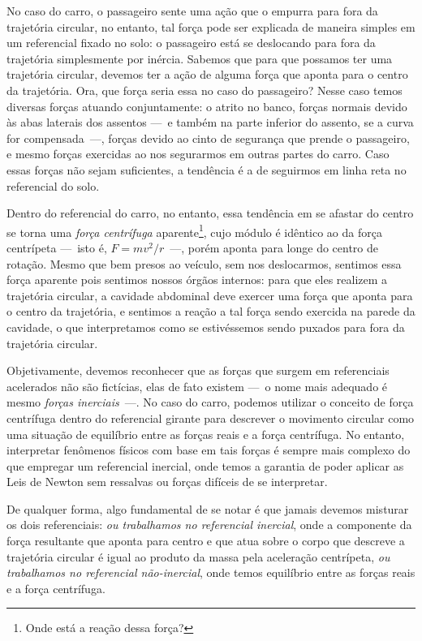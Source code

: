 No caso do carro, o passageiro sente uma ação que o empurra para fora da trajetória circular, no entanto, tal força pode ser explicada de maneira simples em um referencial fixado no solo: o passageiro está se deslocando para fora da trajetória simplesmente por inércia. Sabemos que para que possamos ter uma trajetória circular, devemos ter a ação de alguma força que aponta para o centro da trajetória. Ora, que força seria essa no caso do passageiro? Nesse caso temos diversas forças atuando conjuntamente: o atrito no banco, forças normais devido às abas laterais dos assentos ---~e também na parte inferior do assento, se a curva for compensada~---, forças devido ao cinto de segurança que prende o passageiro, e mesmo forças exercidas ao nos segurarmos em outras partes do carro. Caso essas forças não sejam suficientes, a tendência é a de seguirmos em linha reta no referencial do solo.

Dentro do referencial do carro, no entanto, essa tendência em se afastar do centro se torna uma \emph{força centrífuga} aparente\footnote{Onde está a reação dessa força?}, cujo módulo é idêntico ao da força centrípeta ---~isto é, $F = mv^2/r$~---, porém aponta para longe do centro de rotação. Mesmo que bem presos ao veículo, sem nos deslocarmos, sentimos essa força aparente pois sentimos nossos órgãos internos: para que eles realizem a trajetória circular, a cavidade abdominal deve exercer uma força que aponta para o centro da trajetória, e sentimos a reação a tal força sendo exercida na parede da cavidade, o que interpretamos como se estivéssemos sendo puxados para fora da trajetória circular.

Objetivamente, devemos reconhecer que as forças que surgem em referenciais acelerados não são fictícias, elas de fato existem ---~o nome mais adequado é mesmo \emph{forças inerciais}~---. No caso do carro, podemos utilizar o conceito de força centrífuga dentro do referencial girante para descrever o movimento circular como uma situação de equilíbrio entre as forças reais e a força centrífuga. No entanto, interpretar fenômenos físicos com base em tais forças é sempre mais complexo do que empregar um referencial inercial, onde temos a garantia de poder aplicar as Leis de Newton sem ressalvas ou forças difíceis de se interpretar.

De qualquer forma, algo fundamental de se notar é que jamais devemos misturar os dois referenciais: \emph{ou trabalhamos no referencial inercial}, onde a componente da força resultante que aponta para centro e que atua sobre o corpo que descreve a trajetória circular é igual ao produto da massa pela aceleração centrípeta, \emph{ou trabalhamos no referencial não-inercial}, onde temos equilíbrio entre as forças reais e a força centrífuga.

